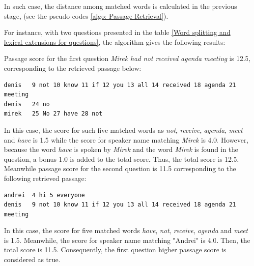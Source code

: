 In such case, the distance among matched words is calculated in the previous stage, (see the pseudo codes \ref{algo: Passage Retrieval}).

For instance, with two questions presented in the table \ref{Word splitting and lexical extensions for questions}, the algorithm gives the following results: 

Passage score for the first question \textit{Mirek had not received agenda meeting} is 12.5, corresponding to the retrieved passage below:
\scriptsize
\begin{verbatim}
denis   9 not 10 know 11 if 12 you 13 all 14 received 18 agenda 21 meeting
denis   24 no 
mirek   25 No 27 have 28 not
\end{verbatim}
\normalsize
 In this case, the score for such five matched words as \textit{not}, \textit{receive}, \textit{agenda}, \textit{meet} and \textit{have} is 1.5 while the score for speaker name matching \textit{Mirek} is 4.0. However, because the word \textit{have} is spoken by \textit{Mirek} and the word \textit{Mirek} is found in the question, a bonus 1.0 is added to the total score. Thus, the total score is 12.5. Meanwhile passage score for the second question is 11.5 corresponding to the following retrieved passage:
\scriptsize
\begin{verbatim}
andrei  4 hi 5 everyone 
denis   9 not 10 know 11 if 12 you 13 all 14 received 18 agenda 21 meeting
\end{verbatim}
\normalsize
In this case, the score for five matched words \textit{have}, \textit{not}, \textit{receive}, \textit{agenda} and \textit{meet} is 1.5. Meanwhile, the score for speaker name matching "Andrei" is 4.0. Then, the total score is 11.5. Consequently, the first question higher passage score is considered as true.



